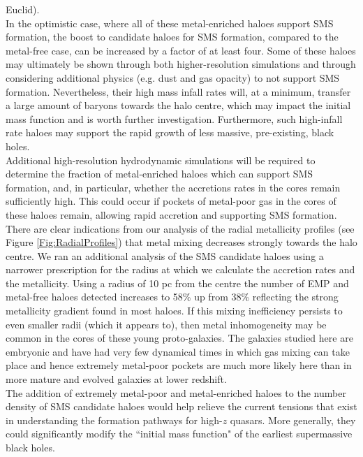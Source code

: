\documentclass[twocolumn,iop,revtex4]{openjournal}
\begin{document}
Euclid). \\
\indent In the optimistic case, where all of these metal-enriched haloes support SMS formation, the
boost to
candidate haloes for SMS formation, compared to the metal-free case, can be increased by a factor of
at least four. Some of these haloes may ultimately be shown through both  higher-resolution simulations
and through considering additional physics (e.g. dust and gas opacity) 
to not support SMS formation. Nevertheless, their high mass infall rates will, at a minimum, transfer
a large amount of baryons towards the halo centre, which may impact the initial mass function and
is worth further investigation. Furthermore, such high-infall rate haloes may support the rapid
growth of less massive, pre-existing, black holes. \\
\indent Additional high-resolution hydrodynamic simulations will be required to
determine the fraction of metal-enriched haloes which can support SMS formation, and, in particular,
whether the accretions rates in the cores remain sufficiently high.  This could occur if pockets
of metal-poor gas in the cores of these haloes remain, allowing rapid accretion and supporting SMS
formation. There are clear indications from our analysis of the radial metallicity profiles
(see Figure \ref{Fig:RadialProfiles}) that metal mixing decreases strongly towards the halo centre.
We ran an additional analysis of the SMS candidate haloes using a narrower prescription for the
radius at which we calculate the accretion rates and the metallicity. Using a radius of 10 pc
from the centre the number of EMP and metal-free haloes detected increases to 58\% up from 38\%
reflecting the strong metallicity gradient found in most haloes. 
If this mixing inefficiency persists to even smaller radii (which it appears to),
then metal inhomogeneity may be common in the cores of these young proto-galaxies. The galaxies
studied here are embryonic and have had very few dynamical times in which 
gas mixing can take place and hence extremely metal-poor pockets are much more likely here than
in more mature and evolved galaxies at lower redshift.\\
\indent  The addition of extremely metal-poor and metal-enriched haloes to the number density of SMS
candidate haloes would help relieve the current tensions that exist in understanding the formation
pathways for high-$z$ quasars. More generally, they could significantly modify the
``initial mass function" of the earliest supermassive black holes.

\end{document}
